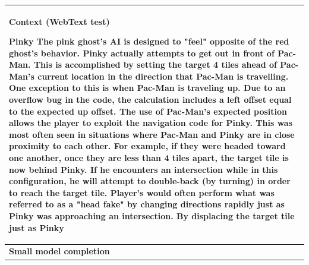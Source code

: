 \documentclass{article}
\begin{document}
\begin{table}[t]
\begin{center}
\begin{tabular}{|p{8cm}|p{8cm}|}

\hline
\multicolumn{2}{|C{16cm}|}{
\centerline{\textbf{Context (WebText test)}}
Pinky \newline\newline The pink ghost's AI is designed to "feel" opposite of the red ghost's behavior. Pinky actually attempts to get out in front of Pac-Man. This is accomplished by setting the target 4 tiles ahead of Pac-Man's current location in the direction that Pac-Man is travelling. One exception to this is when Pac-Man is traveling up. Due to an overflow bug in the code, the calculation includes a left offset equal to the expected up offset. \newline\newline The use of Pac-Man's expected position allows the player to exploit the navigation code for Pinky. This was most often seen in situations where Pac-Man and Pinky are in close proximity to each other. For example, if they were headed toward one another, once they are less than 4 tiles apart, the target tile is now behind Pinky. If he encounters an intersection while in this configuration, he will attempt to double-back (by turning) in order to reach the target tile. \newline\newline Player's would often perform what was referred to as a "head fake" by changing directions rapidly just as Pinky was approaching an intersection. By displacing the target tile just as Pinky
} \\
\hline
\centerline{\textbf{Small model completion}}

\end{tabular}
\end{center}
\end{table}
\end{document}
